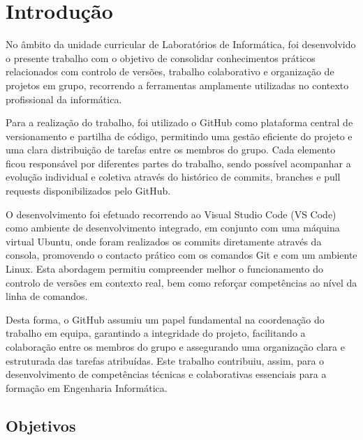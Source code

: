 \chapter {Introdução}


No âmbito da unidade curricular de Laboratórios de Informática, foi desenvolvido o presente trabalho com o objetivo de consolidar conhecimentos práticos relacionados com controlo de versões, trabalho colaborativo e organização de projetos em grupo, recorrendo a ferramentas amplamente utilizadas no contexto profissional da informática.

\vspace*{0.5cm}

Para a realização do trabalho, foi utilizado o GitHub como plataforma central de versionamento e partilha de código, permitindo uma gestão eficiente do projeto e uma clara distribuição de tarefas entre os membros do grupo. Cada elemento ficou responsável por diferentes partes do trabalho, sendo possível acompanhar a evolução individual e coletiva através do histórico de commits, branches e pull requests disponibilizados pelo GitHub.

\vspace*{0.5cm}

O desenvolvimento foi efetuado recorrendo ao Visual Studio Code (VS Code) como ambiente de desenvolvimento integrado, em conjunto com uma máquina virtual Ubuntu, onde foram realizados os commits diretamente através da consola, promovendo o contacto prático com os comandos Git e com um ambiente Linux. Esta abordagem permitiu compreender melhor o funcionamento do controlo de versões em contexto real, bem como reforçar competências ao nível da linha de comandos.

\vspace*{0.5cm}

Desta forma, o GitHub assumiu um papel fundamental na coordenação do trabalho em equipa, garantindo a integridade do projeto, facilitando a colaboração entre os membros do grupo e assegurando uma organização clara e estruturada das tarefas atribuídas. Este trabalho contribuiu, assim, para o desenvolvimento de competências técnicas e colaborativas essenciais para a formação em Engenharia Informática.

\vspace{6cm}


\section{Objetivos}

